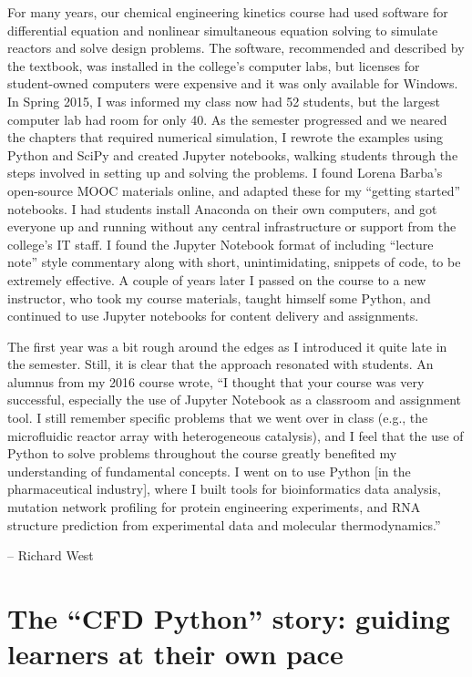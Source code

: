 \documentclass[]{book}
\begin{document}
For many years, our chemical engineering kinetics course had used
software for differential equation and nonlinear simultaneous equation
solving to simulate reactors and solve design problems. The software,
recommended and described by the textbook, was installed in the
college's computer labs, but licenses for student-owned computers were
expensive and it was only available for Windows. In Spring 2015, I was
informed my class now had 52 students, but the largest computer lab had
room for only 40. As the semester progressed and we neared the chapters
that required numerical simulation, I rewrote the examples using Python
and SciPy and created Jupyter notebooks, walking students through the
steps involved in setting up and solving the problems. I found Lorena
Barba's open-source MOOC materials online, and adapted these for my
``getting started'' notebooks. I had students install Anaconda on their
own computers, and got everyone up and running without any central
infrastructure or support from the college's IT staff. I found the
Jupyter Notebook format of including ``lecture note'' style commentary
along with short, unintimidating, snippets of code, to be extremely
effective. A couple of years later I passed on the course to a new
instructor, who took my course materials, taught himself some Python,
and continued to use Jupyter notebooks for content delivery and
assignments.

The first year was a bit rough around the edges as I introduced it quite
late in the semester. Still, it is clear that the approach resonated
with students. An alumnus from my 2016 course wrote, ``I thought that
your course was very successful, especially the use of Jupyter Notebook
as a classroom and assignment tool. I still remember specific problems
that we went over in class (e.g., the microfluidic reactor array with
heterogeneous catalysis), and I feel that the use of Python to solve
problems throughout the course greatly benefited my understanding of
fundamental concepts. I went on to use Python {[}in the pharmaceutical
industry{]}, where I built tools for bioinformatics data analysis,
mutation network profiling for protein engineering experiments, and RNA
structure prediction from experimental data and molecular
thermodynamics.''

-- Richard West

\section{\texorpdfstring{The ``CFD Python'' story: guiding learners at
their own
pace}{The CFD Python story: guiding learners at their own pace}}\label{the-cfd-python-story-guiding-learners-at-their-own-pace}
\end{document}
